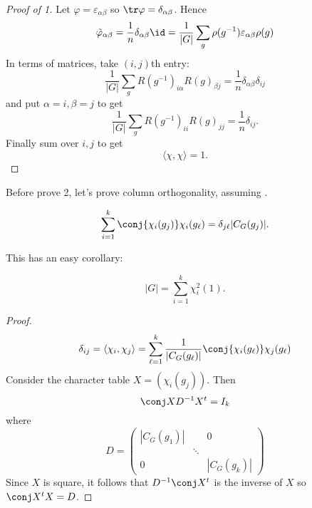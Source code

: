 \documentclass[a4paper]{article}
\theoremstyle{definition}
\begin{document}
\begin{proof}[Proof of  1]
Let \(\varphi = \varepsilon_{\alpha\beta}\) so \(\tr \varphi = \delta_{\alpha\beta}\). Hence
\[
  \tilde \varphi_{\alpha\beta}
  = \frac{1}{n} \delta_{\alpha\beta} \id
  = \frac{1}{|G|} \sum_g \rho(g^{-1}) \varepsilon_{\alpha\beta} \rho(g)
\]
In terms of matrices, take \((i, j)\)th entry:
\[
  \frac{1}{|G|} \sum_g R(g^{-1})_{i\alpha} R(g)_{\beta j} = \frac{1}{n} \delta_{\alpha\beta} \delta_{ij}
\]
and put \(\alpha = i, \beta = j\) to get
\[
  \frac{1}{|G|} \sum_g R(g^{-1})_{ii} R(g)_{jj} = \frac{1}{n} \delta_{ij}.
\]
Finally sum over \(i, j\) to get
\[
  \langle \chi, \chi \rangle = 1.
\]
\end{proof}

Before prove 2, let's prove column orthogonality, assuming .

\begin{corollary}
  \[
    \sum_{i = 1}^k \conj{\chi_i(g_j)} \chi_i(g_\ell) = \delta_{j\ell} |C_G(g_j)|.
  \]
\end{corollary}

This has an easy corollary:

\begin{theorem}
  \[
    |G| = \sum_{i = 1}^k \chi_i^2(1).
  \]
\end{theorem}

\begin{proof}
  \[
    \delta_{ij}
    = \langle \chi_i, \chi_j \rangle
    = \sum_{\ell = 1}^k \frac{1}{|C_G(g_\ell)|} \conj{\chi_i(g_\ell)} \chi_j(g_\ell)
  \]
  Consider the character table \(X = (\chi_i(g_j))\). Then
  \[
    \conj X D^{-1} X^t = I_k
  \]
  where
  \[
    D =
    \begin{pmatrix}
      |C_G(g_1)| & & 0 \\
      & \ddots \\
      0 & & |C_G(g_k)|
    \end{pmatrix}
  \]
  Since \(X\) is square, it follows that \(D^{-1} \conj X^t\) is the inverse of \(X\) so \(\conj X^t X = D\).
\end{proof}
\end{document}
